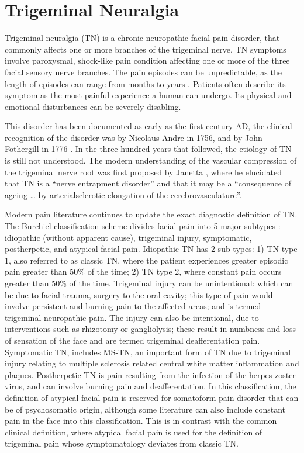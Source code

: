 \section{Trigeminal Neuralgia}

Trigeminal neuralgia (TN) is a chronic neuropathic facial pain disorder, that commonly affects one or more branches of the trigeminal nerve. TN symptoms involve paroxysmal, shock-like pain condition affecting one or more of the three facial sensory nerve branches. The pain episodes can be unpredictable, as the length of episodes can range from months to years \cite{Katusic1990}. Patients often describe its symptom as the most painful experience a human can undergo. Its physical and emotional disturbances can be severely disabling. 

This disorder has been documented as early as the first century AD, the clinical recognition of the disorder was by Nicolaus Andre in 1756, and by John Fothergill in 1776 \cite{Katusic1990}. In the three hundred years that followed, the etiology of TN is still not understood. The modern understanding of the vascular compression of the trigeminal nerve root was first proposed by Janetta \cite{Jannetta1967}, where he elucidated that TN is a “nerve entrapment disorder” and that it may be a “consequence of ageing … by arterialsclerotic elongation of the cerebrovasculature”.

Modern pain literature continues to update the exact diagnostic definition of TN. The Burchiel classification scheme divides facial pain into 5 major subtypes \cite{Burchiel2003,Eller2005}: idiopathic (without apparent cause), trigeminal injury, symptomatic, postherpetic, and atypical facial pain. Idiopathic TN has 2 sub-types: 1) TN type 1, also referred to as classic TN, where the patient experiences greater episodic pain greater than 50\% of the time; 2) TN type 2, where constant pain occurs greater than 50\% of the time. Trigeminal injury can be unintentional: which can be due to facial trauma, surgery to the oral cavity; this type of pain would involve persistent and burning pain to the affected areas; and is termed trigeminal neuropathic pain. The injury can also be intentional, due to interventions such as rhizotomy or gangliolysis; these result in numbness and loss of sensation of the face and are termed trigeminal deafferentation pain. Symptomatic TN, includes MS-TN, an important form of TN due to trigeminal injury relating to multiple sclerosis related central white matter inflammation and plaques. Postherpetic TN is pain resulting from the infection of the herpes zoster virus, and can involve burning pain and deafferentation. In this classification, the definition of atypical facial pain is reserved for somatoform pain disorder that can be of psychosomatic origin, although some literature can also include constant pain in the face into this classification. This is in contrast with the common clinical definition, where atypical facial pain is used for the definition of trigeminal pain whose symptomatology deviates from classic TN.

